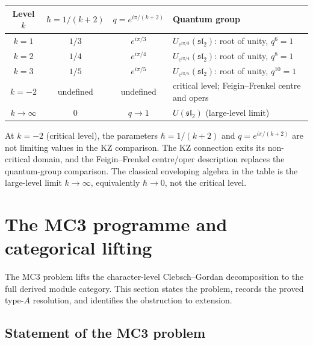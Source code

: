 \begin{computation}
\begin{center}
\renewcommand{\arraystretch}{1.2}
\begin{tabular}{cccl}
\textbf{Level $k$} & $\hbar=1/(k+2)$
 & $q=e^{i\pi/(k+2)}$ & \textbf{Quantum group} \\
\hline
$k=1$ & $1/3$ & $e^{i\pi/3}$
 & $U_{e^{i\pi/3}}(\mathfrak{sl}_2)$:
 root of unity, $q^6=1$ \\[3pt]
$k=2$ & $1/4$ & $e^{i\pi/4}$
 & $U_{e^{i\pi/4}}(\mathfrak{sl}_2)$:
 root of unity, $q^8=1$ \\[3pt]
$k=3$ & $1/5$ & $e^{i\pi/5}$
 & $U_{e^{i\pi/5}}(\mathfrak{sl}_2)$:
 root of unity, $q^{10}=1$ \\[3pt]
$k=-2$ & undefined & undefined
 & critical level; Feigin--Frenkel centre and opers \\[3pt]
$k\to\infty$ & $0$ & $q\to 1$
 & $U(\mathfrak{sl}_2)$ (large-level limit)
\end{tabular}
\end{center}
At $k=-2$ (critical level), the parameters
$\hbar=1/(k+2)$ and $q=e^{i\pi/(k+2)}$ are not limiting values in
the KZ comparison. The KZ connection exits its non-critical domain,
and the Feigin--Frenkel centre/oper description replaces the
quantum-group comparison. The classical enveloping algebra in the
table is the large-level limit $k\to\infty$, equivalently
$\hbar\to0$, not the critical level.
\end{computation}


\section{The MC3 programme and categorical lifting}

The MC3 problem lifts the
character-level Clebsch--Gordan decomposition to the
full derived module category. This section states the
problem, records the proved type-$A$ resolution, and
identifies the obstruction to extension.

\subsection{Statement of the MC3 problem}

